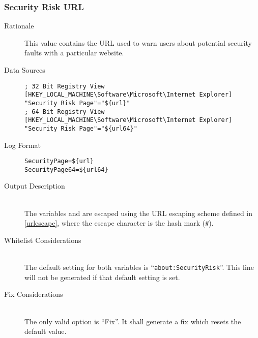 \subsubsection{Security Risk URL}
\begin{description}
\item[Rationale] This value contains the URL used to warn users about potential
security faults with a particular website.

\item[Data Sources] \hfill
\vspace{-\baselineskip}
\begin{verbatim}
; 32 Bit Registry View
[HKEY_LOCAL_MACHINE\Software\Microsoft\Internet Explorer]
"Security Risk Page"="${url}"
; 64 Bit Registry View
[HKEY_LOCAL_MACHINE\Software\Microsoft\Internet Explorer]
"Security Risk Page"="${url64}"
\end{verbatim}
\item[Log Format] \hfill
\vspace{-\baselineskip}
\begin{verbatim} 
SecurityPage=${url}
SecurityPage64=${url64}
\end{verbatim}
\item[Output Description] \hfill \\
The variables  and  are escaped using the URL escaping
scheme defined in \ref{urlescape}, where the escape character is the hash mark
(\verb|#|).
\item[Whitelist Considerations] \hfill \\
The default setting for both variables is ``\verb|about:SecurityRisk|''. This
line will not be generated if that default setting is set.
\item[Fix Considerations] \hfill \\
The only valid option is ``Fix''. It shall generate a fix which resets the
default value.
\end{description}


